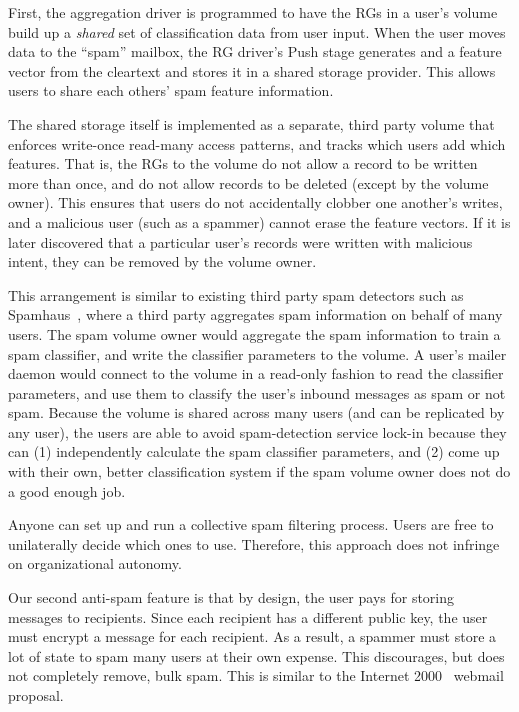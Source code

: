First, the aggregation driver is programmed to have the RGs in a user's volume build
up a \emph{shared} set of classification data from user input.  When the user
moves data to the ``spam'' mailbox, the RG driver's Push stage generates and
a feature vector from the cleartext and stores it in a shared storage
provider.  This allows
users to share each others' spam feature information.

The shared storage itself is implemented as a separate, third party volume that enforces write-once read-many
access patterns, and tracks which users add which features.  That is, the RGs to the volume do not allow a record to be
written more than once, and do not allow records to be deleted (except by the
volume owner).  This ensures
that users do not accidentally clobber one another's writes, and a malicious
user (such as a spammer) cannot erase the feature vectors.  If it is later
discovered that a particular user's records were written with malicious intent,
they can be removed by the volume owner.

This arrangement is similar to existing third party spam detectors such as
Spamhaus~\cite{spamhaus}, where a third party aggregates spam information 
on behalf of many users.  The spam volume owner would aggregate the spam
information to train a spam classifier, and write the classifier parameters
to the volume.  A user's mailer daemon would connect to the volume in a read-only fashion
to read the classifier parameters, and use them to classify the user's inbound
messages as spam or not spam.  Because the volume is shared across many users
(and can be replicated by any user), the users are able to avoid spam-detection
service lock-in because they can (1) independently calculate the spam classifier
parameters, and (2) come up with their own, better classification system if the
spam volume owner does not do a good enough job.

Anyone can set up and run a collective spam filtering process.  Users are free
to unilaterally decide which ones to use.  Therefore, this approach does not
infringe on organizational autonomy.


Our second anti-spam feature is that by design, the user pays for storing messages to recipients.  Since each
recipient has a different public key, the user must encrypt a message for each
recipient.  As a result, a spammer
must store a lot of state to spam many users at their own expense.  This
discourages, but does not completely remove, bulk spam.  This is similar to
the Internet 2000~\cite{internet2000} webmail proposal.


